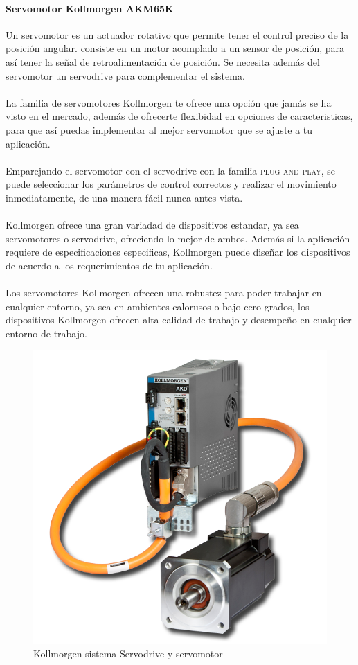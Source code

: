 \documentclass[12pt,titlepage]{article}
\begin{document}
\paragraph{Servomotor Kollmorgen AKM65K \\}
\hspace{-4.5mm}Un servomotor es un actuador rotativo que permite tener el control preciso de la posición angular. consiste en un motor acomplado a un sensor de posición, para así tener la señal de retroalimentación de posición. Se necesita además del servomotor un servodrive para complementar el sistema. \\\\
La familia de servomotores Kollmorgen te ofrece una opción que jamás se ha visto en el mercado, además de ofrecerte flexibidad en opciones de caracteristicas, para que así puedas implementar al mejor servomotor que se ajuste a tu aplicación. \\\\
Emparejando el servomotor con el servodrive con la familia \textsc{plug and play}, se puede seleccionar los parámetros de control correctos y realizar el movimiento inmediatamente, de una manera fácil nunca antes vista. \\\\

Kollmorgen ofrece una gran variadad de dispositivos estandar, ya sea servomotores o servodrive, ofreciendo lo mejor de ambos. Además si la aplicación requiere de especificaciones especificas, Kollmorgen puede diseñar los dispositivos de acuerdo a los requerimientos de tu aplicación. \\\\

Los servomotores Kollmorgen ofrecen una robustez para poder trabajar en cualquier entorno, ya sea en ambientes calorusos o bajo cero grados, los dispositivos Kollmorgen ofrecen alta calidad de trabajo y desempeño en cualquier entorno de trabajo. \\[25mm]

\begin{figure}[!ht]
\center
\includegraphics[scale=0.60]{servo2}
\caption{Kollmorgen sistema Servodrive y servomotor}
\end{figure}


 
\end{document}
